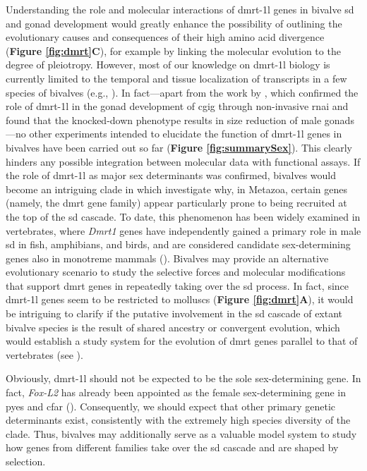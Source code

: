 \documentclass[../main.tex]{subfiles}
\begin{document}
Understanding the role and molecular interactions of \gls{dmrt-1l} genes in bivalve \gls{sd} and gonad development would greatly enhance the possibility of outlining the evolutionary causes and consequences of their high amino acid divergence (\textbf{Figure \ref{fig:dmrt}C}), for example by linking the molecular evolution to the degree of pleiotropy. However, most of our knowledge on \gls{dmrt-1l} biology is currently limited to the temporal and tissue localization of transcripts in a few species of bivalves (e.g., \textbf{\cite{li2018foxl2,yue2021variance}}). In fact—apart from the work by \textbf{\cite{sun2022examination}}, which confirmed the role of \gls{dmrt-1l} in the gonad development of \gls{cgig} through non-invasive \gls{rnai} and found that the knocked-down phenotype results in size reduction of male gonads—no other experiments intended to elucidate the function of \gls{dmrt-1l} genes in bivalves have been carried out so far (\textbf{Figure \ref{fig:summarySex}}). This clearly hinders any possible integration between molecular data with functional assays.
If the role of \gls{dmrt-1l} as major sex determinants was confirmed, bivalves would become an intriguing clade in which investigate why, in Metazoa, certain genes (namely, the \gls{dmrt} gene family) appear particularly prone to being recruited at the top of the \gls{sd} cascade. To date, this phenomenon has been widely examined in vertebrates, where \textit{Dmrt1} genes have independently gained a primary role in male \gls{sd} in fish, amphibians, and birds, and are considered candidate sex-determining genes also in monotreme mammals (\textbf{\cite{marshall2010homologies,beukeboom2014evolution,mawaribuchi2019independent}}). Bivalves may provide an alternative evolutionary scenario to study the selective forces and molecular modifications that support \gls{dmrt} genes in repeatedly taking over the \gls{sd} process. In fact, since \gls{dmrt-1l} genes seem to be restricted to molluscs (\textbf{Figure \ref{fig:dmrt}A}), it would be intriguing to clarify if the putative involvement in the \gls{sd} cascade of extant bivalve species is the result of shared ancestry or convergent evolution, which would establish a study system for the evolution of \gls{dmrt} genes parallel to that of vertebrates (see \textbf{\cite{capel2017vertebrate}}).

Obviously, \gls{dmrt-1l} should not be expected to be the sole sex-determining gene. In fact, \textit{Fox-L2} has already been appointed as the female sex-determining gene in \gls{pyes} and \gls{cfar} (\textbf{\cite{han2022ancient}}). Consequently, we should expect that other primary genetic determinants exist, consistently with the extremely high species diversity of the clade. Thus, bivalves may additionally serve as a valuable model system to study how genes from different families take over the \gls{sd} cascade and are shaped by selection.
\end{document}
